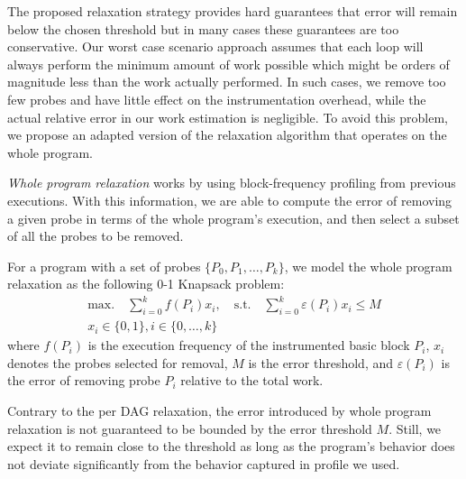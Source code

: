 The proposed relaxation strategy provides hard guarantees that error will remain below the chosen threshold but in many cases these
guarantees are too conservative. Our worst case scenario approach assumes that each loop will always perform the minimum amount of work
possible which might be orders of magnitude less than the work actually performed. In such cases, we remove too few probes and have little
effect on the instrumentation overhead, while the actual relative error in our work estimation is negligible. To avoid this problem, we
propose an adapted version of the relaxation algorithm that operates on the whole program.

\textit{Whole program relaxation} works by using block-frequency profiling from previous executions. With this information, we are able to
compute the error of removing a given probe in terms of the whole program's execution, and then select a subset of all the probes to be
removed.

For a program with a set of probes $\{P_0, P_1, \ldots, P_k\}$, we model the whole program relaxation as the following 0-1 Knapsack
problem:
\begin{gather*}
\textrm{max.}\quad\sum_{i=0}^{k} f(P_i)x_i,\quad
\textrm{s.t.}\quad\sum_{i=0}^{k} \varepsilon(P_i)x_i \leq M \\
x_i\in\{0,1\}, i\in\{0,\ldots,k\}
\end{gather*}
where $f(P_i)$ is the execution frequency of the instrumented basic block $P_i$, $x_i$ denotes the probes selected for removal, $M$ is the
error threshold, and $\varepsilon(P_i)$ is the error of removing probe $P_i$ relative to the total work.

Contrary to the per DAG relaxation, the error introduced by whole program relaxation is not guaranteed to be bounded by the error threshold
$M$. Still, we expect it to remain close to the threshold as long as the program's behavior does not deviate significantly from the
behavior captured in profile we used.
